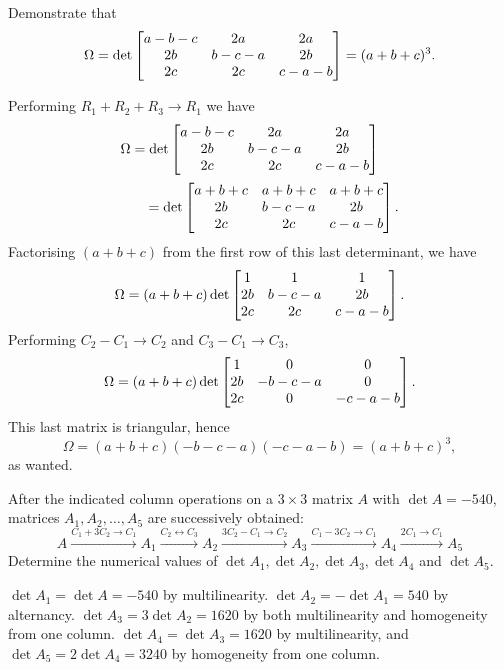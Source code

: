 \begin{pro}
Demonstrate that $$\Omega = \det\begin{bmatrix} a - b - c & 2a &
2a \cr 2b & b - c - a & 2b \cr 2c & 2c & c - a - b \cr
\end{bmatrix} = (a + b + c)^3.
$$
\begin{answer} Performing $R_1 + R_2 + R_3 \rightarrow R_1$ we have
$$\begin{array}{l}
\Omega = \det\begin{bmatrix} a - b - c & 2a & 2a \cr 2b & b - c -
a & 2b \cr 2c & 2c & c - a - b \cr
\end{bmatrix}\vspace{2mm}\\ \qquad = \det\begin{bmatrix} a + b + c & a + b + c & a + b + c \cr 2b
& b - c - a & 2b \cr 2c & 2c & c - a - b \cr
\end{bmatrix}.\end{array}$$ Factorising $(a + b + c)$ from the first row of
this last determinant, we have
$$\Omega =   (a + b + c)\det\begin{bmatrix} 1 & 1 & 1 \cr 2b
& b - c - a & 2b \cr 2c & 2c & c - a - b \cr
\end{bmatrix}. $$Performing $C_2 - C_1 \rightarrow C_2$ and $C_3 - C_1 \rightarrow
C_3$,
$$\Omega =   (a + b + c)\det\begin{bmatrix} 1 & 0 & 0 \cr 2b
& -b - c - a & 0 \cr 2c & 0 & -c - a - b \cr
\end{bmatrix}. $$This last matrix is triangular, hence $$\Omega = (a + b + c)(-b - c - a)(-c -a - b) = (a + b + c)^3,  $$
as wanted.
\end{answer}
\end{pro}

\begin{pro} After the indicated column operations on a $3\times 3$
 matrix $A$ with $\det A = -540$, matrices $A_1, A_2, \ldots , A_5$
 are successively obtained:
 $$A \stackrel{C_1 + 3C_2 \rightarrow C_1}{\rightarrow} A_1
 \stackrel{C_2 \leftrightarrow C_3}{\rightarrow} A_2 \stackrel{3C_2
 - C_1 \rightarrow C_2}{\rightarrow} A_3 \stackrel{C_1 - 3C_2
 \rightarrow C_1}{\rightarrow} A_4 \stackrel{2C_1  \rightarrow
 C_1}{\rightarrow} A_5$$ Determine  the numerical values
 of $\det A_1, \det A_2, \det A_3, \det A_4$ and $\det A_5.$
 \begin{answer} $\det A_1 = \det A = -540$ by multilinearity. $\det A_2 = -\det
 A_1 = 540$ by alternancy. $\det A_3 = 3\det A_2 = 1620$  by both
 multilinearity and homogeneity from one column. $\det A_4 = \det A_3
 = 1620$ by multilinearity, and $\det A_5 = 2\det A_4 = 3240$ by
 homogeneity from one column.
 \end{answer}
\end{pro}


